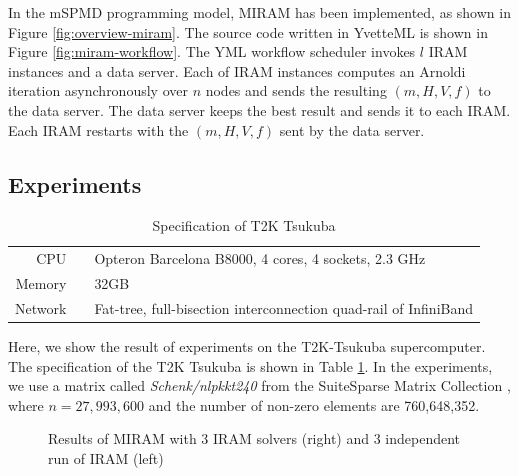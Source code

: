\documentclass[graybox]{svmult}
\begin{document}
In the mSPMD programming model, MIRAM has been implemented, as shown in Figure \ref{fig:overview-miram}. 
The source code written in YvetteML is shown in Figure \ref{fig:miram-workflow}. 
The YML workflow scheduler invokes $l$ IRAM instances and a data server. 
Each of IRAM instances computes an Arnoldi iteration asynchronously over $n$ nodes and sends the resulting $(m, H, V, f)$ to the data server.
The data server keeps the best result and sends it to each IRAM. Each IRAM restarts with the $(m, H, V, f)$ sent by the data server. 

\subsection{Experiments}


\begin{table}[t]
\begin{center}
 \caption{Specification of T2K Tsukuba}
 \label{table:t2k-spec}
\begin{tabular}[t]{rrl}\hline\hline
 CPU & & Opteron Barcelona B8000, 4 cores, 4 sockets, 2.3 GHz\\
Memory && 32GB\\
Network & & Fat-tree, full-bisection interconnection quad-rail of InfiniBand\\\hline
\end{tabular}
\end{center}
\end{table}

Here, we show the result of experiments on the T2K-Tsukuba supercomputer. The specification of the T2K Tsukuba is shown in Table \ref{table:t2k-spec}. 
In the experiments, we use a matrix called {\it Schenk/nlpkkt240} from the SuiteSparse Matrix Collection \cite{matrix-collection}, where $n=27,993,600$ and the number of non-zero elements are  760,648,352. 


\begin{figure}[t]
 \begin{center}
  \caption{Results of MIRAM with 3 IRAM solvers (right) and 3 independent run of IRAM (left)}
  \label{figure:result-miram}
 \end{center}
\end{figure}
\end{document}
